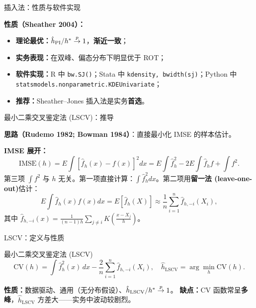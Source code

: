 \documentclass[aspectratio=169, 10pt]{beamer}
\begin{document}
\begin{frame}{插入法：性质与软件实现}

  \begin{keybox}
    \textbf{性质（Sheather 2004）：}
    \begin{itemize}
      \item \textbf{理论最优：}$\hat h_{\text{PI}}/h^* \overset{p}{\to} 1$，\textbf{渐近一致}；
      \item \textbf{实务表现：}在双峰、偏态分布下明显优于 ROT；
      \item \textbf{软件实现：}R 中 \texttt{bw.SJ()}；Stata 中 \texttt{kdensity, bwidth(sj)}；Python 中 \texttt{statsmodels.nonparametric.KDEUnivariate}；
      \item \textbf{推荐：}Sheather--Jones 插入法是实务\textbf{首选}。
    \end{itemize}
  \end{keybox}

\end{frame}


\begin{frame}{最小二乘交叉鉴定法 (LSCV)：推导}

  \textbf{思路（Rudemo 1982; Bowman 1984）}：直接最小化 IMSE 的样本估计。

  \textbf{IMSE 展开：}
  \[
    \text{IMSE}(h) = E\!\int [\hat f_h(x) - f(x)]^2 dx
    = E\!\int \hat f_h^2 - 2E\!\int \hat f_h f + \int f^2.
  \]
  第三项 $\int f^2$ 与 $h$ 无关。第一项直接计算：$\int \hat f_h^2 dx$。第二项用\textbf{留一法 (leave-one-out)}估计：
  \[
    E\!\int \hat f_h(x) f(x) dx = E[\hat f_h(X)] \approx \frac{1}{n}\sum_{i=1}^n \hat f_{h,-i}(X_i),
  \]
  其中 $\hat f_{h,-i}(x) = \frac{1}{(n-1)h}\sum_{j\neq i} K\!\left(\frac{x-X_j}{h}\right)$。

\end{frame}


\begin{frame}{LSCV：定义与性质}

  \begin{definitionbox}{最小二乘交叉鉴定法 (LSCV)}
    \[
      \boxed{\; \text{CV}(h) = \int \hat f_h^2(x)\, dx - \frac{2}{n}\sum_{i=1}^n \hat f_{h,-i}(X_i),\quad \hat h_{\text{LSCV}} = \arg\min_h \text{CV}(h).\;}
    \]
  \end{definitionbox}

  \begin{keybox}
    \textbf{性质：}数据驱动、通用（无分布假设）、$\hat h_{\text{LSCV}}/h^*\overset{p}{\to} 1$。
    \textbf{缺点：}CV 函数常呈\textbf{多峰}，$\hat h_{\text{LSCV}}$ 方差大——实务中波动较剧烈。
  \end{keybox}

\end{frame}
\end{document}
